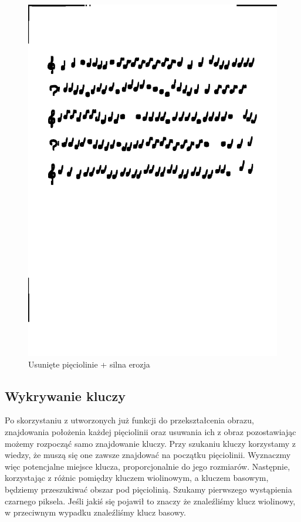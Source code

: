 \documentclass[11pt]{article}
\begin{document}
\begin{figure}[H]
    \centering
    \graphicspath{ {blobs/} }
    \includegraphics[scale=0.15]{4.jpg}
    \caption{Usunięte pięciolinie + silna erozja}
    \label{fig:universe}
    \end{figure}

\subsection{Wykrywanie kluczy}
Po skorzystaniu z utworzonych już funkcji do przekształcenia obrazu, znajdowania położenia każdej pięciolinii oraz usuwania ich z obraz pozostawiając możemy rozpocząć samo znajdowanie kluczy.
Przy szukaniu kluczy korzystamy z wiedzy, że muszą się one zawsze znajdować na początku pięciolinii. Wyznaczmy więc potencjalne miejsce klucza, proporcjonalnie do jego rozmiarów.
Następnie, korzystając z różnic pomiędzy kluczem wiolinowym, a kluczem basowym, będziemy przeszukiwać obszar pod pięciolinią. Szukamy pierwszego wystąpienia czarnego piksela. Jeśli jakiś się pojawił to znaczy że znaleźliśmy klucz wiolinowy, w przeciwnym wypadku znaleźliśmy klucz basowy.
\end{document}
